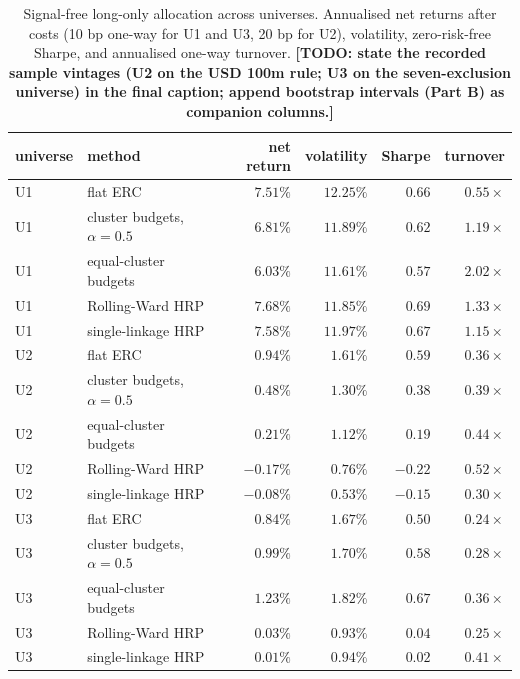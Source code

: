 \documentclass[11pt]{article}
\theoremstyle{remark}
\newcommand{\TODO}[1]{\textbf{[TODO: #1]}}
\begin{document}
\begin{table}[htbp]
\centering
\caption{Signal-free long-only allocation across universes. Annualised net
returns after costs (10 bp one-way for U1 and U3, 20 bp for U2), volatility,
zero-risk-free Sharpe, and annualised one-way turnover.
\TODO{state the recorded sample vintages (U2 on the USD 100m rule; U3 on the
seven-exclusion universe) in the final caption; append bootstrap intervals
(Part B) as companion columns.}}
\label{tab:risk}
\small
\begin{tabular}{llrrrr}
\toprule
universe & method & net return & volatility & Sharpe & turnover \\
\midrule
U1 & flat ERC & $7.51\%$ & $12.25\%$ & $0.66$ & $0.55\times$ \\
U1 & cluster budgets, $\alpha=0.5$ & $6.81\%$ & $11.89\%$ & $0.62$ & $1.19\times$ \\
U1 & equal-cluster budgets & $6.03\%$ & $11.61\%$ & $0.57$ & $2.02\times$ \\
U1 & Rolling-Ward HRP & $7.68\%$ & $11.85\%$ & $0.69$ & $1.33\times$ \\
U1 & single-linkage HRP & $7.58\%$ & $11.97\%$ & $0.67$ & $1.15\times$ \\
\midrule
U2 & flat ERC & $0.94\%$ & $1.61\%$ & $0.59$ & $0.36\times$ \\
U2 & cluster budgets, $\alpha=0.5$ & $0.48\%$ & $1.30\%$ & $0.38$ & $0.39\times$ \\
U2 & equal-cluster budgets & $0.21\%$ & $1.12\%$ & $0.19$ & $0.44\times$ \\
U2 & Rolling-Ward HRP & $-0.17\%$ & $0.76\%$ & $-0.22$ & $0.52\times$ \\
U2 & single-linkage HRP & $-0.08\%$ & $0.53\%$ & $-0.15$ & $0.30\times$ \\
\midrule
U3 & flat ERC & $0.84\%$ & $1.67\%$ & $0.50$ & $0.24\times$ \\
U3 & cluster budgets, $\alpha=0.5$ & $0.99\%$ & $1.70\%$ & $0.58$ & $0.28\times$ \\
U3 & equal-cluster budgets & $1.23\%$ & $1.82\%$ & $0.67$ & $0.36\times$ \\
U3 & Rolling-Ward HRP & $0.03\%$ & $0.93\%$ & $0.04$ & $0.25\times$ \\
U3 & single-linkage HRP & $0.01\%$ & $0.94\%$ & $0.02$ & $0.41\times$ \\
\bottomrule
\end{tabular}
\end{table}
\end{document}
